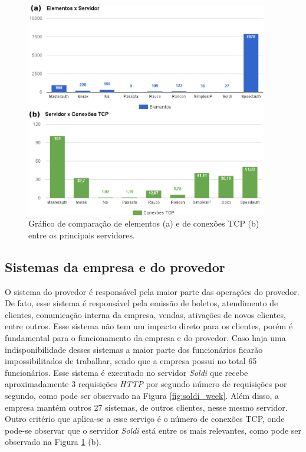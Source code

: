 \begin{figure}[h!]
 \centering
 \includegraphics[width=400px]{img/elementos_tcp.eps}
 \caption{Gráfico de comparação de elementos (a) e de conexões TCP (b) entre os principais servidores.}
 \label{fig:elementos_tcp}
\end{figure}

\subsection{Sistemas da empresa e do provedor}
\label{section:sistemas}

O sistema do provedor é responsável pela maior parte das operações do provedor. De fato, esse sistema é responsável pela emissão de boletos, 
atendimento de clientes, comunicação interna da empresa, vendas, ativações de novos clientes, entre outros. Esse sistema não tem um impacto 
direto para os clientes, porém é fundamental para o funcionamento da empresa e do provedor. Caso haja uma indisponibilidade desses sistemas 
a maior parte dos funcionários ficarão impossibilitados de trabalhar, sendo que a empresa possui no total 65 funcionários.
Esse sistema é executado no servidor \textit{Soldi} que recebe aproximadamente 3 requisições \textit{HTTP} \cite{??} por segundo número de 
requisições por segundo, como pode ser observado na Figura \ref{fig:soldi_week}. Além disso, a empresa mantém outros 27 sistemas, de outros 
clientes, nesse mesmo servidor. 
Outro critério que aplica-se a esse serviço é o número de conexões \ac{TCP}, onde pode-se observar que o servidor \textit{Soldi} está 
entre os mais relevantes, como pode ser observado na Figura \ref{fig:elementos_tcp} (b). 

